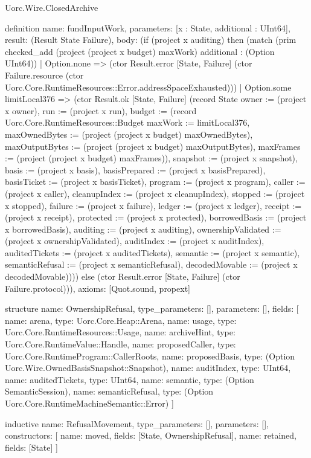 \begin{lexlean}{Uorc.Wire.ClosedArchive}
\begin{semanticmodule}
definition{
  name: fundInputWork,
  parameters: [x : State, additional : UInt64],
  result: (Result State Failure),
  body: (if (project x auditing) then (match (prim checked_add (project (project x budget) maxWork) additional : (Option UInt64))
    | Option.none => (ctor Result.error [State, Failure] (ctor Failure.resource (ctor Uorc.Core.RuntimeResources::Error.addressSpaceExhausted)))
    | Option.some limitLocal376 => (ctor Result.ok [State, Failure] (record State {owner := (project x owner), run := (project x run), budget := (record Uorc.Core.RuntimeResources::Budget {maxWork := limitLocal376, maxOwnedBytes := (project (project x budget) maxOwnedBytes), maxOutputBytes := (project (project x budget) maxOutputBytes), maxFrames := (project (project x budget) maxFrames)}), snapshot := (project x snapshot), basis := (project x basis), basisPrepared := (project x basisPrepared), basisTicket := (project x basisTicket), program := (project x program), caller := (project x caller), cleanupIndex := (project x cleanupIndex), stopped := (project x stopped), failure := (project x failure), ledger := (project x ledger), receipt := (project x receipt), protected := (project x protected), borrowedBasis := (project x borrowedBasis), auditing := (project x auditing), ownershipValidated := (project x ownershipValidated), auditIndex := (project x auditIndex), auditedTickets := (project x auditedTickets), semantic := (project x semantic), semanticRefusal := (project x semanticRefusal), decodedMovable := (project x decodedMovable)}))) else (ctor Result.error [State, Failure] (ctor Failure.protocol))),
  axioms: [Quot.sound, propext]
}

structure{
  name: OwnershipRefusal,
  type_parameters: [],
  parameters: [],
  fields: [
    {name: arena, type: Uorc.Core.Heap::Arena},
    {name: usage, type: Uorc.Core.RuntimeResources::Usage},
    {name: archiveHint, type: Uorc.Core.RuntimeValue::Handle},
    {name: proposedCaller, type: Uorc.Core.RuntimeProgram::CallerRoots},
    {name: proposedBasis, type: (Option Uorc.Wire.OwnedBasisSnapshot::Snapshot)},
    {name: auditIndex, type: UInt64},
    {name: auditedTickets, type: UInt64},
    {name: semantic, type: (Option SemanticSession)},
    {name: semanticRefusal, type: (Option Uorc.Core.RuntimeMachineSemantic::Error)}
  ]
}

inductive{
  name: RefusalMovement,
  type_parameters: [],
  parameters: [],
  constructors: [
    {name: moved, fields: [State, OwnershipRefusal]},
    {name: retained, fields: [State]}
  ]
}


\end{semanticmodule}
\end{lexlean}
